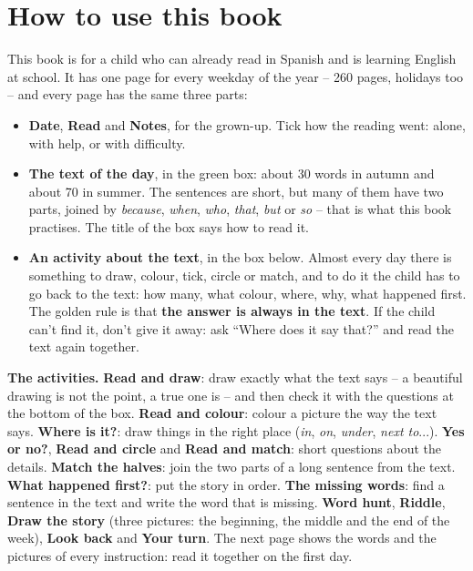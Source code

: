 \section*{How to use this book}

This book is for a child who can already read in Spanish and is learning
English at school. It has one page for every weekday of the year -- 260
pages, holidays too -- and every page has the same three parts:

\begin{itemize}[leftmargin=6mm, itemsep=1mm]
\item \textbf{Date}, \textbf{Read} and \textbf{Notes}, for the grown-up.
  Tick how the reading went: alone, with help, or with difficulty.
\item \textbf{The text of the day}, in the green box: about 30 words in
  autumn and about 70 in summer. The sentences are short, but many of
  them have two parts, joined by \textit{because}, \textit{when},
  \textit{who}, \textit{that}, \textit{but} or \textit{so} -- that is
  what this book practises. The title of the box says how to read it.
\item \textbf{An activity about the text}, in the box below. Almost every
  day there is something to draw, colour, tick, circle or match, and to
  do it the child has to go back to the text: how many, what colour,
  where, why, what happened first. The golden rule is that \textbf{the
  answer is always in the text}. If the child can't find it, don't give
  it away: ask ``Where does it say that?'' and read the text again
  together.
\end{itemize}

\textbf{The activities.} \textbf{Read and draw}: draw exactly what the
text says -- a beautiful drawing is not the point, a true one is -- and
then check it with the questions at the bottom of the box.
\textbf{Read and colour}: colour a picture the way the text says.
\textbf{Where is it?}: draw things in the right place (\textit{in},
\textit{on}, \textit{under}, \textit{next to}...). \textbf{Yes or no?},
\textbf{Read and circle} and \textbf{Read and match}: short questions
about the details. \textbf{Match the halves}: join the two parts of a
long sentence from the text. \textbf{What happened first?}: put the
story in order. \textbf{The missing words}: find a sentence in the text
and write the word that is missing. \textbf{Word hunt}, \textbf{Riddle},
\textbf{Draw the story} (three pictures: the beginning, the middle and the
end of the week), \textbf{Look back} and \textbf{Your turn}. The next page
shows the words and the pictures of every instruction: read it together
on the first day.


